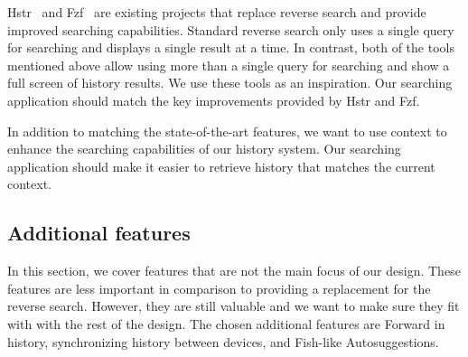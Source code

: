 \documentclass[thesis=M,english]{FITthesis}[2012/10/20]
\let\myCite\cite
\renewcommand\cite{\unskip~\myCite}
\begin{document}


Hstr\cite{toolshstr} and Fzf\cite{tools-fzf} are existing projects that replace reverse search and provide improved searching capabilities. 
Standard reverse search only uses a single query for searching and displays a single result at a time. In contrast, both of the tools mentioned above allow using more than a single query for searching and show a full screen of history results. We use these tools as an inspiration. Our searching application should match the key improvements provided by Hstr and Fzf. 



In addition to matching the state-of-the-art features, we want to use context to enhance the searching capabilities of our history system. Our searching application should make it easier to retrieve history that matches the current context. 





\subsection{Additional features}

In this section, we cover features that are not the main focus of our design. These features are less important in comparison to providing a replacement for the reverse search. However, they are still valuable and we want to make sure they fit with with the rest of the design. 
The chosen additional features are Forward in history, synchronizing history between devices, and Fish-like Autosuggestions.
\end{document}
